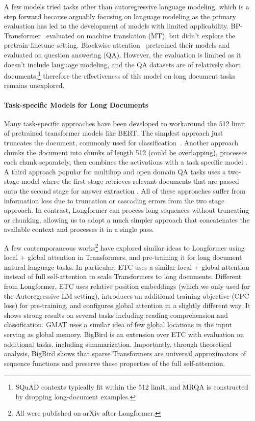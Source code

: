 \documentclass[11pt,a4paper]{article}
\newcommand{\model}{Longformer\xspace}
\begin{document}
A few models tried tasks other than autoregressive language modeling,
which is 
a step forward because arguably focusing on 
language modeling as the primary evaluation
has led to the development of models with limited applicability.  BP-Transformer~\cite{BPTransformer} evaluated on 
machine translation (MT), but didn't explore the pretrain-finetune setting.
Blockwise attention~\cite{blockbert} pretrained their models and evaluated 
on question answering (QA). However, the evaluation is 
limited as it doesn't include language modeling, and the QA datasets
are of relatively short documents,\footnote{
SQuAD contexts typically fit within the 512 limit, 
and MRQA is constructed by dropping long-document examples. 
} therefore the effectiveness of this model on long document tasks remains unexplored.

\paragraph{Task-specific Models for Long Documents}
Many task-specific approaches have been developed to 
workaround the 512 limit of pretrained transformer models like BERT.
The simplest approach just truncates the document, commonly used for classification~\cite{truncateimdb}. 
Another approach chunks the document into chunks of 
length 512 (could be overlapping), processes each chunk separately, then combines the activations with a task specific model \cite{joshi-etal-2019-bert}.
A third approach popular for multihop and open domain QA tasks uses a two-stage model where the first stage retrieves relevant documents that are passed onto the second stage for answer extraction \cite{Clark2017SimpleAE,Chen2017ReadingWT}.
All of these approaches suffer from information loss due to truncation or cascading errors from the two stage approach.
In contrast, \model can process long sequences without truncating or chunking, allowing us to adopt a much simpler approach that concatenates the available context and processes it in a single pass. 

A few contemporaneous works\footnote{All were published on arXiv after Longformer.} have explored similar ideas to Longformer using local + global attention in Transformers, and pre-training it for long document natural language tasks. In particular, ETC \cite{ainslie-etal-2020-etc} uses a similar local + global attention instead of full self-attention to scale Transformers to long documents. Different from Longformer, ETC uses relative position embeddings (which we only used for the Autoregressive LM setting), introduces an additional training objective (CPC loss) for pre-training, and configures global attention in a slightly different way. It shows strong results on several tasks including reading comprehension and classification.
GMAT \cite{Gupta2020GMATGM} uses a similar idea of few global locations in the input serving as global memory. BigBird \cite{Zaheer2020BigBT} is an extension over ETC with evaluation on additional tasks, including summarization. Importantly, through theoretical analysis, BigBird shows that sparse Transformers are universal approximators of sequence functions and preserve these properties of the full self-attention.
\end{document}
